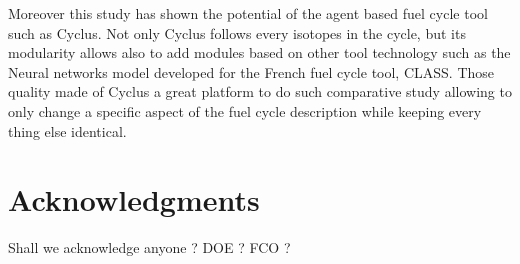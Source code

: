 \documentclass{anstrans}
\begin{document}
Moreover this study has shown the potential of the agent based fuel cycle tool
such as Cyclus. Not only Cyclus follows every isotopes in the cycle,
but its modularity allows also to add modules based on other tool technology such
as the Neural networks model developed for the French fuel cycle tool, CLASS.
Those quality made of Cyclus a great platform to do such comparative study
allowing to only change a specific aspect of the fuel cycle description while
keeping every thing else identical.






%

\section{Acknowledgments}
Shall we acknowledge anyone ? DOE ? FCO ?




\end{document}
